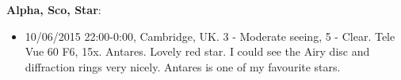 {\bf Alpha, Sco, Star}:
\begin{itemize}
\item 10/06/2015 22:00-0:00, Cambridge, UK. 3 - Moderate seeing, 5 - Clear. Tele Vue 60 F6, 15x. Antares. Lovely red star. I could see the Airy disc and diffraction rings very nicely. Antares is one of my favourite stars. 
\end{itemize}
